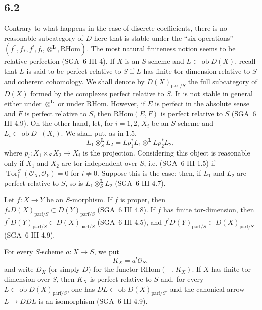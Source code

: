 \documentclass[11pt]{article}
\providecommand{\cO}{\mathcal{O}}
\DeclareMathOperator{\Tor}{Tor}
\providecommand{\RHom}{\mathrm{RHom}}
\providecommand{\RHom}{\mathrm{RHom}}
\providecommand{\RHom}{\mathrm R\mathcal{H}om}
\begin{document}
\subsection*{6.2}
Contrary to what happens in the case of discrete coefficients, there is no reasonable subcategory of $D$ here that is stable under the ``six operations'' $(f^*,f_*,f^!,f_!,\otimes^{\mathbf L},\RHom)$. The most natural finiteness notion seems to be relative perfection (SGA~6 III 4). If $X$ is an $S$-scheme and $L\in\operatorname{ob}D(X)$, recall that $L$ is said to be perfect relative to $S$ if $L$ has finite tor-dimension relative to $S$ and coherent cohomology. We shall denote by $D(X)_{\mathrm{parf}/S}$ the full subcategory of $D(X)$ formed by the complexes perfect relative to $S$. It is not stable in general either under $\otimes^{\mathbf L}$ or under $\RHom$. However, if $E$ is perfect in the absolute sense and $F$ is perfect relative to $S$, then $\RHom(E,F)$ is perfect relative to $S$ (SGA~6 III 4.9). On the other hand, let, for $i=1,2$, $X_i$ be an $S$-scheme and $L_i\in\operatorname{ob}D^{-}(X_i)$. We shall put, as in 1.5,
\[
L_1\otimes_S^{\mathbf L}L_2=Lp_1^*L_1\otimes^{\mathbf L}Lp_2^*L_2,
\]
where $p_i:X_1\times_SX_2\to X_i$ is the projection. Considering this object is reasonable only if $X_1$ and $X_2$ are tor-independent over $S$, i.e. (SGA~6 III 1.5) if $\Tor_i^S(\cO_X,\cO_Y)=0$ for $i\ne0$. Suppose this is the case: then, if $L_1$ and $L_2$ are perfect relative to $S$, so is $L_1\otimes_S^{\mathbf L}L_2$ (SGA~6 III 4.7).

Let $f:X\to Y$ be an $S$-morphism. If $f$ is proper, then $f_*D(X)_{\mathrm{parf}/S}\subset D(Y)_{\mathrm{parf}/S}$ (SGA~6 III 4.8). If $f$ has finite tor-dimension, then $f^*D(Y)_{\mathrm{parf}/S}\subset D(X)_{\mathrm{parf}/S}$ (SGA~6 III 4.5), and $f^!D(Y)_{\mathrm{parf}/S}\subset D(X)_{\mathrm{parf}/S}$ (SGA~6 III 4.9).

For every $S$-scheme $a:X\to S$, we put
\begin{equation}
\tag{6.2.1}
K_X=a^!\cO_S,
\end{equation}
and write $D_X$ (or simply $D$) for the functor $\RHom(-,K_X)$. If $X$ has finite tor-dimension over $S$, then $K_X$ is perfect relative to $S$ and, for every $L\in\operatorname{ob}D(X)_{\mathrm{parf}/S}$, one has $DL\in\operatorname{ob}D(X)_{\mathrm{parf}/S}$, and the canonical arrow $L\to DDL$ is an isomorphism (SGA~6 III 4.9).
\end{document}

